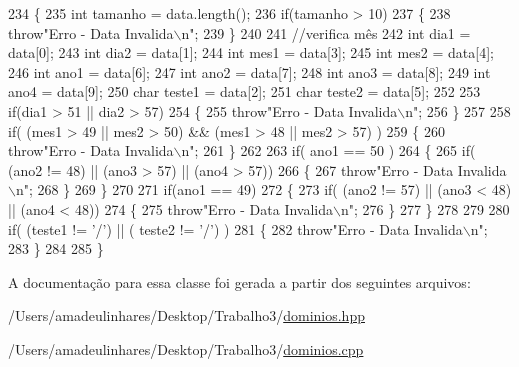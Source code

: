 \begin{DoxyCode}
234 \{
235   \textcolor{keywordtype}{int} tamanho = data.length();
236   \textcolor{keywordflow}{if}(tamanho > 10)
237   \{
238     \textcolor{keywordflow}{throw}\textcolor{stringliteral}{"Erro - Data Invalida\(\backslash\)n"};
239   \}
240 
241   \textcolor{comment}{//verifica mês}
242   \textcolor{keywordtype}{int} dia1 = data[0];
243   \textcolor{keywordtype}{int} dia2 = data[1];
244   \textcolor{keywordtype}{int} mes1 = data[3];
245   \textcolor{keywordtype}{int} mes2 = data[4];
246   \textcolor{keywordtype}{int} ano1 = data[6];
247   \textcolor{keywordtype}{int} ano2 = data[7];
248   \textcolor{keywordtype}{int} ano3 = data[8];
249   \textcolor{keywordtype}{int} ano4 = data[9];
250   \textcolor{keywordtype}{char} teste1 = data[2];
251   \textcolor{keywordtype}{char} teste2 = data[5];
252 
253   \textcolor{keywordflow}{if}(dia1 > 51 || dia2 > 57)
254   \{
255     \textcolor{keywordflow}{throw}\textcolor{stringliteral}{"Erro - Data Invalida\(\backslash\)n"};
256   \}
257 
258   \textcolor{keywordflow}{if}( (mes1 > 49 || mes2 > 50) && (mes1 > 48 || mes2 > 57)  )
259   \{
260     \textcolor{keywordflow}{throw}\textcolor{stringliteral}{"Erro - Data Invalida\(\backslash\)n"};
261   \}
262 
263   \textcolor{keywordflow}{if}( ano1 == 50 )
264   \{
265     \textcolor{keywordflow}{if}( (ano2 != 48) || (ano3 > 57) || (ano4 > 57))
266     \{
267       \textcolor{keywordflow}{throw}\textcolor{stringliteral}{"Erro - Data Invalida\(\backslash\)n"};
268     \}
269   \}
270 
271   \textcolor{keywordflow}{if}(ano1 == 49)
272   \{
273     \textcolor{keywordflow}{if}( (ano2 != 57) || (ano3 < 48) || (ano4 < 48))
274     \{
275       \textcolor{keywordflow}{throw}\textcolor{stringliteral}{"Erro - Data Invalida\(\backslash\)n"};
276     \}
277   \}
278 
279 
280   \textcolor{keywordflow}{if}( (teste1 != \textcolor{charliteral}{'/'}) || ( teste2 != \textcolor{charliteral}{'/'}) )
281   \{
282     \textcolor{keywordflow}{throw}\textcolor{stringliteral}{"Erro - Data Invalida\(\backslash\)n"};
283   \}
284 
285 \}
\end{DoxyCode}


A documentação para essa classe foi gerada a partir dos seguintes arquivos\+:\begin{DoxyCompactItemize}
\item 
/\+Users/amadeulinhares/\+Desktop/\+Trabalho3/\mbox{\hyperlink{dominios_8hpp}{dominios.\+hpp}}\item 
/\+Users/amadeulinhares/\+Desktop/\+Trabalho3/\mbox{\hyperlink{dominios_8cpp}{dominios.\+cpp}}\end{DoxyCompactItemize}

